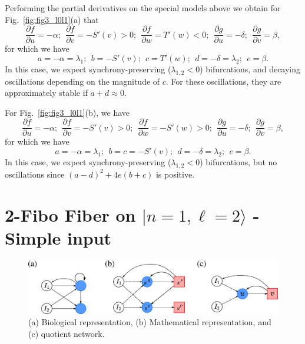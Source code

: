 \documentclass[12pt]{article}
\begin{document}
Performing the partial derivatives on the special models
above we obtain for Fig.~\ref{fig:fig3_l0l1}(a) that 
\begin{equation}
    \dfrac{\partial f}{\partial u} = -\alpha; \ \
    \dfrac{\partial f}{\partial v} = -S'(v) > 0; \ \
    \dfrac{\partial f}{\partial w} = T'(w) < 0; \ \ 
    \dfrac{\partial g}{\partial u} = -\delta; \ \
    \dfrac{\partial g}{\partial v} = \beta, 
\end{equation}
for which we have
\begin{equation}
    a = -\alpha = \lambda_1; \ \ 
    b = -S'(v); \ \
    c = T'(w); \ \  
    d = -\delta = \lambda_2; \ \ 
    e = \beta.
\end{equation}
In this case, we expect synchrony-preserving
($\lambda_{1,2} < 0$) 
bifurcations, and decaying oscillations depending
on the magnitude of $c$. For these oscillations, they
are approximately stable if $a + d \approx 0$.

For Fig.~\ref{fig:fig3_l0l1}(b), we have
\begin{equation}
    \dfrac{\partial f}{\partial u} = -\alpha; \ \
    \dfrac{\partial f}{\partial v} = -S'(v) > 0; \ \
    \dfrac{\partial f}{\partial w} = -S'(w) > 0; \ \ 
    \dfrac{\partial g}{\partial u} = -\delta; \ \
    \dfrac{\partial g}{\partial v} = \beta, 
\end{equation}
for which we have
\begin{equation}
    a = -\alpha = \lambda_1; \ \ 
    b = c = -S'(v); \ \
    d = -\delta = \lambda_2; \ \ 
    e = \beta.
\end{equation}
In this case, we expect synchrony-preserving
($\lambda_{1,2} < 0$) 
bifurcations, but no oscillations since 
$(a-d)^2 + 4e(b+c)$ is positive.

\section{2-Fibo Fiber on $| n = 1, \ell = 2\rangle$ - Simple input}

\begin{figure}[H]
    \centering
    \includegraphics[scale=0.5]{figs/fibo2_simple.png}
    \caption{(a) Biological representation, 
        (b) Mathematical representation, and (c) quotient
        network.}
    \label{fig:fig4}
\end{figure}
\end{document}
